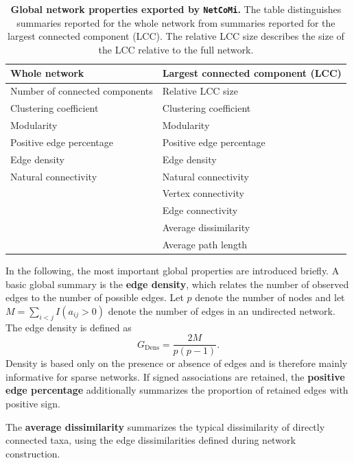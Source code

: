 \begin{table}[!htb]
\centering
\caption{\textbf{Global network properties exported by \texttt{NetCoMi}.} The table distinguishes summaries reported for the whole network from summaries reported for the largest connected component (LCC). The relative LCC size describes the size of the LCC relative to the full network.}
\label{tab:5net:net_analysis:global_network_properties}
\vspace{0.5em}
\begin{tabular}{ll}
\toprule
Whole network & Largest connected component (LCC) \\
\midrule
Number of connected components & Relative LCC size \\
Clustering coefficient & Clustering coefficient \\
Modularity & Modularity \\
Positive edge percentage & Positive edge percentage \\
Edge density & Edge density \\
Natural connectivity & Natural connectivity \\
& Vertex connectivity \\
& Edge connectivity \\
& Average dissimilarity \\
& Average path length \\
\bottomrule
\end{tabular}
\end{table}

In the following, the most important global properties are introduced briefly. A basic global summary is the \textbf{edge density}, which relates the number of observed edges to the number of possible edges. Let $p$ denote the number of nodes and let $M=\sum_{i<j} I(a_{ij}>0)$ denote the number of edges in an undirected network. The edge density is defined as
\begin{equation}
\label{eq:5net:net_analysis:edge_density}
G_{\mathrm{Dens}} = \frac{2M}{p(p-1)}.
\end{equation}
Density is based only on the presence or absence of edges and is therefore mainly informative for sparse networks. If signed associations are retained, the \textbf{positive edge percentage} additionally summarizes the proportion of retained edges with positive sign.

The \textbf{average dissimilarity} summarizes the typical dissimilarity of directly connected taxa, using the edge dissimilarities defined during network construction. 

